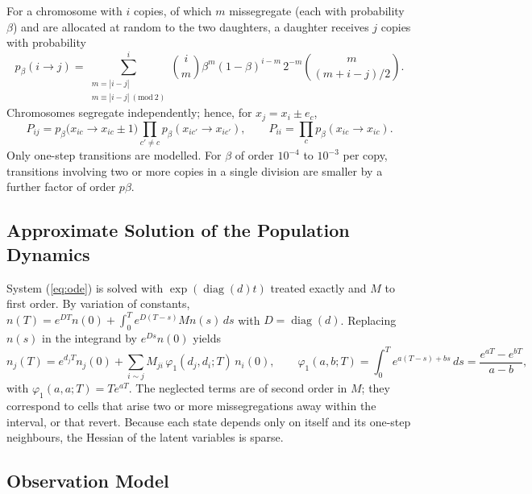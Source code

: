 \documentclass[11pt]{article}
\begin{document}
For a chromosome with $i$ copies, of which $m$ missegregate (each with
probability $\beta$) and are allocated at random to the two daughters, a
daughter receives $j$ copies with probability
\begin{equation}
  p_\beta(i\to j)=\sum_{\substack{m=|i-j|\\ m\equiv|i-j|\ (\mathrm{mod}\ 2)}}^{i}
  \binom{i}{m}\beta^m(1-\beta)^{i-m}\,2^{-m}\binom{m}{(m+i-j)/2}.
  \label{eq:pij}
\end{equation}
Chromosomes segregate independently; hence, for $x_j=x_i\pm e_c$,
\begin{equation}
  P_{ij}=p_\beta\bigl(x_{ic}\to x_{ic}\pm1\bigr)\prod_{c'\ne c}p_\beta(x_{ic'}\to x_{ic'}),
  \qquad
  P_{ii}=\prod_{c}p_\beta(x_{ic}\to x_{ic}).
  \label{eq:Pij}
\end{equation}
Only one-step transitions are modelled. For $\beta$ of order $10^{-4}$ to
$10^{-3}$ per copy, transitions involving two or more copies in a single
division are smaller by a further factor of order $p\beta$.

\subsection{Approximate Solution of the Population Dynamics}
\label{sec:sj-forward}

System (\ref{eq:ode}) is solved with $\exp(\operatorname{diag}(d)t)$ treated
exactly and $M$ to first order. By variation of constants,
$n(T)=e^{DT}n(0)+\int_0^Te^{D(T-s)}Mn(s)\,ds$ with $D=\operatorname{diag}(d)$.
Replacing $n(s)$ in the integrand by $e^{Ds}n(0)$ yields
\begin{equation}
  n_j(T)=e^{d_jT}n_j(0)+\sum_{i\sim j}M_{ji}\,\varphi_1(d_j,d_i;T)\,n_i(0),
  \qquad
  \varphi_1(a,b;T)=\int_0^Te^{a(T-s)+bs}\,ds=\frac{e^{aT}-e^{bT}}{a-b},
  \label{eq:forward}
\end{equation}
with $\varphi_1(a,a;T)=Te^{aT}$. The neglected terms are of second order in
$M$; they correspond to cells that arise two or more missegregations away
within the interval, or that revert. Because each state depends only on itself
and its one-step neighbours, the Hessian of the latent variables is sparse.

\subsection{Observation Model}
\label{sec:sj-obs}
\end{document}
